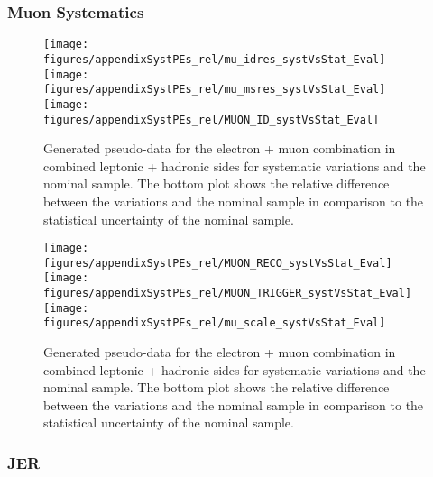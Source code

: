 \clearpage
\subsubsection{Muon Systematics}

\begin{figure}[!hb]
\begin{center}
        
        \texttt{[image: figures/appendixSystPEs\_rel/mu\_idres\_systVsStat\_Eval]}\\
        \texttt{[image: figures/appendixSystPEs\_rel/mu\_msres\_systVsStat\_Eval]}\\
        \texttt{[image: figures/appendixSystPEs\_rel/MUON\_ID\_systVsStat\_Eval]}
        
\caption{Generated pseudo-data for the electron + muon combination in combined leptonic + hadronic sides for systematic variations and the nominal \ttbar sample. The bottom plot shows the relative difference between the variations and the nominal sample in comparison to the statistical uncertainty of the nominal sample.}   
\label{fig:systematicVar_lephad_MUON}
\end{center}
\end{figure}


\begin{figure}[!hb]
\begin{center}
        
        \texttt{[image: figures/appendixSystPEs\_rel/MUON\_RECO\_systVsStat\_Eval]}\\
        \texttt{[image: figures/appendixSystPEs\_rel/MUON\_TRIGGER\_systVsStat\_Eval]}\\
        \texttt{[image: figures/appendixSystPEs\_rel/mu\_scale\_systVsStat\_Eval]}
        
\caption{Generated pseudo-data for the electron + muon combination in combined leptonic + hadronic sides for systematic variations and the nominal \ttbar sample. The bottom plot shows the relative difference between the variations and the nominal sample in comparison to the statistical uncertainty of the nominal sample.}   
\label{fig:systematicVar_lephad_MUON}
\end{center}
\end{figure}



\clearpage
\subsubsection{JER}

